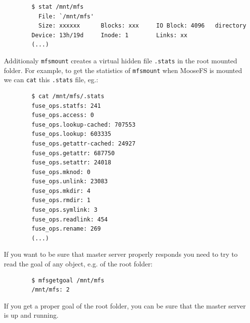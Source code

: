 \documentclass[a4paper,11pt,english]{report}
\def\code#1{\texttt{#1}}
\begin{document}
		
		\begin{lstlisting}
		$ stat /mnt/mfs
		  File: `/mnt/mfs'
		  Size: xxxxxx    	Blocks: xxx		IO Block: 4096   directory
		Device: 13h/19d		Inode: 1		Links: xx
		(...)
		\end{lstlisting}
		
		Additionaly \code{mfsmount} creates a virtual hidden file \code{.stats} in the root mounted folder. For example, to get the statistics of \code{mfsmount} when MooseFS is mounted we can \code{cat} this \code{.stats} file, eg.:
		
		\begin{lstlisting}
		$ cat /mnt/mfs/.stats
		fuse_ops.statfs: 241
		fuse_ops.access: 0
		fuse_ops.lookup-cached: 707553
		fuse_ops.lookup: 603335
		fuse_ops.getattr-cached: 24927
		fuse_ops.getattr: 687750
		fuse_ops.setattr: 24018
		fuse_ops.mknod: 0
		fuse_ops.unlink: 23083
		fuse_ops.mkdir: 4
		fuse_ops.rmdir: 1
		fuse_ops.symlink: 3
		fuse_ops.readlink: 454
		fuse_ops.rename: 269
		(...)
		\end{lstlisting}
		
		If you want to be sure that master server properly responds you need to try to read the goal of any object, e.g. of the root folder:
		
		\begin{lstlisting}
		$ mfsgetgoal /mnt/mfs
		/mnt/mfs: 2
		\end{lstlisting}
		
		If you get a proper goal of the root folder, you can be sure that the master server is up and running.
\end{document}
